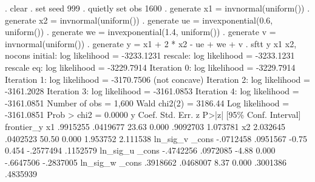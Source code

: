 . clear
{\smallskip}
. set seed 999
{\smallskip}
. quietly set obs 1600
{\smallskip}
. generate x1 = invnormal(uniform())
{\smallskip}
. generate x2 = invnormal(uniform())
{\smallskip}
. generate ue = invexponential(0.6, uniform())
{\smallskip}
. generate we = invexponential(1.4, uniform())
{\smallskip}
. generate v = invnormal(uniform())
{\smallskip}
. generate y = x1 + 2 * x2 - ue + we + v
{\smallskip}
. sftt y x1 x2, nocons
{\smallskip}
initial:       log likelihood = -3233.1231
rescale:       log likelihood = -3233.1231
rescale eq:    log likelihood = -3229.7914
Iteration 0:   log likelihood = -3229.7914  
Iteration 1:   log likelihood = -3170.7506  (not concave)
Iteration 2:   log likelihood = -3161.2028  
Iteration 3:   log likelihood = -3161.0853  
Iteration 4:   log likelihood = -3161.0851  
{\smallskip}
{}
{\smallskip}
                                                Number of obs     =      1,600
                                                Wald chi2(2)      =    3186.44
Log likelihood = -3161.0851                     Prob > chi2       =     0.0000
{\smallskip}
           y {\VBAR}      Coef.   Std. Err.      z    P>|z|     [95\% Conf. Interval]
frontier_y   {\VBAR}
          x1 {\VBAR}   .9915255   .0419677    23.63   0.000     .9092703    1.073781
          x2 {\VBAR}   2.032645   .0402523    50.50   0.000     1.953752    2.111538
ln_sig_v     {\VBAR}
       _cons {\VBAR}  -.0712458   .0951567    -0.75   0.454    -.2577494    .1152579
ln_sig_u     {\VBAR}
       _cons {\VBAR}  -.4742256   .0972085    -4.88   0.000    -.6647506   -.2837005
ln_sig_w     {\VBAR}
       _cons {\VBAR}   .3918662   .0468007     8.37   0.000     .3001386    .4835939
